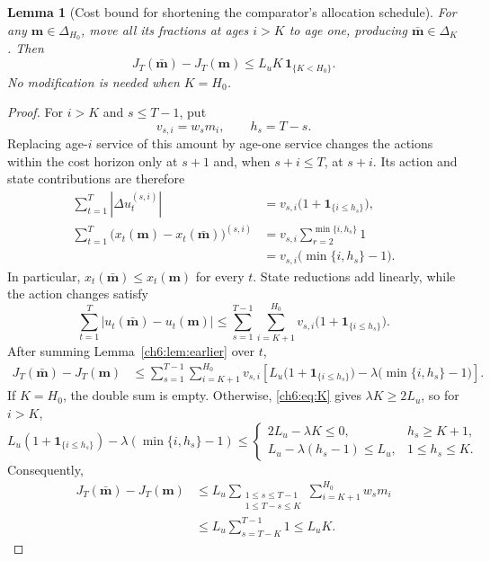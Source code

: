 \documentclass[11pt]{article}
\newcommand{\ind}[1]{\mathbf{1}_{\{#1\}}}
\theoremstyle{plain}
\newtheorem{Thm:Lemma}[Thm:Theorem]{Lemma}
\theoremstyle{remark}
\numberwithin{equation}{section}
\begin{document}
\begin{Thm:Lemma}[Cost bound for shortening the comparator's allocation schedule]\label{ch6:lem:reduce}
For any $\mathbf m\in\Delta_{H_0}$, move all its fractions at ages $i>K$ to age one,
producing $\bar{\mathbf m}\in\Delta_K$. Then
\begin{equation}\label{ch6:eq:reduce}
 J_T(\bar{\mathbf m})-J_T(\mathbf m)\le L_uK\,\ind{K<H_0}.
\end{equation}
No modification is needed when $K=H_0$.
\end{Thm:Lemma}
\begin{proof}
For $i>K$ and $s\le T-1$, put
\[
v_{s,i}=w_sm_i,\qquad h_s=T-s.
\]
Replacing age-$i$ service of this amount by age-one service changes the
actions within the cost horizon only at $s+1$ and, when $s+i\le T$, at $s+i$.
Its action and state contributions are therefore
\begin{align*}
\sum_{t=1}^{T}|\Delta u_t^{(s,i)}|
&=v_{s,i}\bigl(1+\ind{i\le h_s}\bigr),\\
\sum_{t=1}^{T}\bigl(x_t(\mathbf m)-x_t(\bar{\mathbf m})\bigr)^{(s,i)}
&=v_{s,i}\sum_{r=2}^{\min\{i,h_s\}}1\\
&=v_{s,i}\bigl(\min\{i,h_s\}-1\bigr).
\end{align*}
In particular, $x_t(\bar{\mathbf m})\le x_t(\mathbf m)$ for every $t$.
State reductions add linearly, while the action changes satisfy
\[
\sum_{t=1}^{T}|u_t(\bar{\mathbf m})-u_t(\mathbf m)|
\le\sum_{s=1}^{T-1}\sum_{i=K+1}^{H_0}
v_{s,i}\bigl(1+\ind{i\le h_s}\bigr).
\]
After summing Lemma~\ref{ch6:lem:earlier} over $t$,
\begin{align}
J_T(\bar{\mathbf m})-J_T(\mathbf m)
&\le\sum_{s=1}^{T-1}\sum_{i=K+1}^{H_0}v_{s,i}
\left[
L_u\bigl(1+\ind{i\le h_s}\bigr)
-\lambda\bigl(\min\{i,h_s\}-1\bigr)
\right].
\label{ch6:eq:moved-net}
\end{align}
If $K=H_0$, the double sum is empty.  Otherwise,
\eqref{ch6:eq:K} gives $\lambda K\ge2L_u$, so for $i>K$,
\[
L_u(1+\ind{i\le h_s})-\lambda(\min\{i,h_s\}-1)
\le
\begin{cases}
2L_u-\lambda K\le0, & h_s\ge K+1,\\
L_u-\lambda(h_s-1)\le L_u, & 1\le h_s\le K.
\end{cases}
\]
Consequently,
\begin{align*}
J_T(\bar{\mathbf m})-J_T(\mathbf m)
&\le L_u\sum_{\substack{1\le s\le T-1\\1\le T-s\le K}}
\sum_{i=K+1}^{H_0}w_sm_i\\
&\le L_u\sum_{s=T-K}^{T-1}1
\le L_uK.
\end{align*}
\end{proof}
\end{document}
